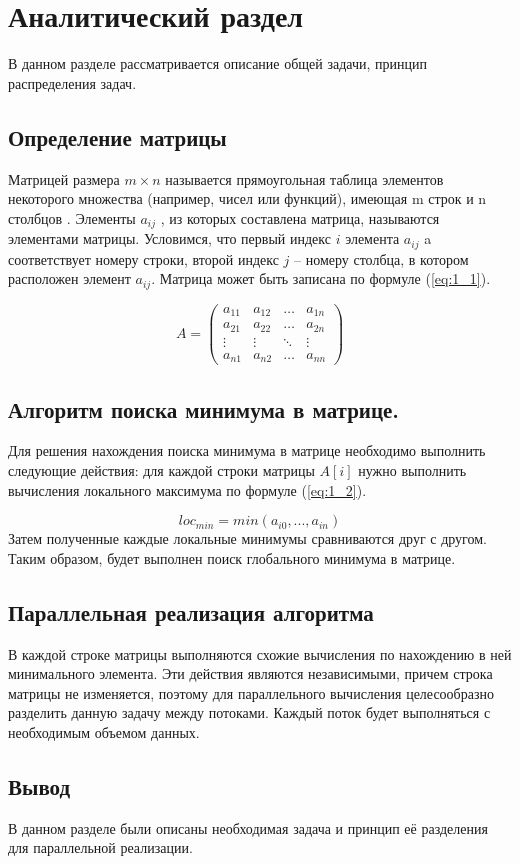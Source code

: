 \chapter{Аналитический раздел}

В данном разделе рассматривается описание общей задачи, принцип распределения задач.

\section{Определение матрицы}
Матрицей размера $m \times n$ называется прямоугольная таблица элементов некоторого множества 
(например, чисел или функций), имеющая m строк и n столбцов \cite{angem}.
Элементы $a_{ij}$ , из которых составлена матрица, называются элементами матрицы.
Условимся, что первый индекс $i$ элемента $a_{ij}$ a
соответствует номеру строки, второй индекс $j$ – номеру столбца, в котором расположен элемент $a_{ij}$.
Матрица может быть записана по формуле (\ref{eq:1_1}).

\begin{equation}
	A = \left(
	\begin{array}{cccc}
		a_{11} & a_{12} & \ldots & a_{1n} \\
		a_{21} & a_{22} & \ldots & a_{2n} \\
		\vdots & \vdots & \ddots & \vdots \\
		a_{n1} & a_{n2} & \ldots & a_{nn}
	\end{array}
	\right)
	\label{eq:1_1}
\end{equation}

\section{Алгоритм поиска минимума в матрице.}
Для решения нахождения поиска минимума в матрице необходимо выполнить следующие действия: для каждой строки матрицы $A[i]$ нужно выполнить вычисления локального максимума по формуле (\ref{eq:1_2}).

\begin{equation}
	loc_{min} = min(a_{i0}, ... , a_{in})
	\label{eq:1_2}
\end{equation}
Затем полученные каждые локальные минимумы сравниваются друг с другом. Таким образом, будет выполнен поиск глобального минимума в матрице.

\section{Параллельная реализация алгоритма}
В каждой строке матрицы выполняются схожие вычисления по нахождению в ней минимального элемента. Эти действия являются независимыми, причем строка матрицы не изменяется, поэтому для параллельного вычисления целесообразно разделить данную задачу между потоками. Каждый поток будет выполняться с необходимым объемом данных.

\section{Вывод}
В данном разделе были описаны необходимая задача и принцип её разделения для параллельной реализации.